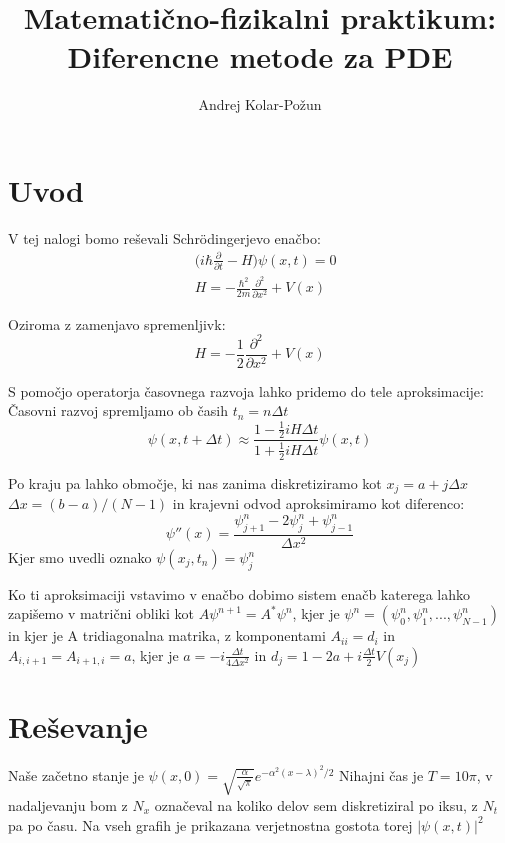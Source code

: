 \documentclass{article}
\title{Matemati{\v c}no-fizikalni praktikum: Diferencne metode za PDE}
\author{Andrej Kolar-Po{\v z}un}
\begin{document}
\maketitle
\newpage
{}

\section{Uvod}

V tej nalogi bomo reševali Schrödingerjevo enačbo:
\begin{align*}
&\Big(i\hbar \frac{\partial}{\partial t} - H \Big) \psi(x,t) = 0 \\
&H = -\frac{\hbar ^2}{2m} \frac{\partial ^2}{\partial x^2} + V(x) 
\end{align*}

Oziroma z zamenjavo spremenljivk:
\begin{equation*}
H = -\frac{1}{2}\frac{\partial^2}{\partial x^2} + V(x)
\end{equation*}

S pomočjo operatorja časovnega razvoja lahko pridemo do tele aproksimacije:
Časovni razvoj spremljamo ob časih $t_n = n \Delta t$
\begin{equation*}
\psi(x,t+\Delta t) \approx \frac{1-\frac{1}{2}i H \Delta t}{1+\frac{1}{2}i H \Delta t}\psi (x,t)
\end{equation*}

Po kraju pa lahko območje, ki nas zanima diskretiziramo kot $x_j = a+j \Delta x$ $\Delta x = (b-a)/(N-1)$ in krajevni odvod
aproksimiramo kot diferenco:
\begin{equation*}
\psi ''(x) = \frac{\psi_{j+1}^n - 2\psi_j^n + \psi_{j-1} ^n}{\Delta x^2}
\end{equation*}
Kjer smo uvedli oznako $\psi(x_j,t_n) = \psi_j^n$

Ko ti aproksimaciji vstavimo v enačbo dobimo sistem enačb katerega lahko zapišemo v matrični
obliki kot $A\psi^{n+1} = A^* \psi^n$, kjer je $\psi ^n = (\psi_0^n,\psi_1^n,...,\psi_{N-1}^n)$ in kjer je
A tridiagonalna matrika, z komponentami $A_{ii} = d_i$ in $A_{i, i+1} =A_{i+1,i} = a$,
kjer je $a = -i\frac{\Delta t}{4 \Delta x^2}$ in $d_j = 1 -2a + i\frac{\Delta t}{2}V(x_j)$

\section{Reševanje}
Naše začetno stanje je $\psi(x,0) = \sqrt{\frac{\alpha}{\sqrt{\pi}}} e^{-\alpha^2(x-\lambda)^2/2}$
Nihajni čas je $T=10\pi$, v nadaljevanju bom z $N_x$ označeval na koliko delov sem diskretiziral po iksu, z $N_t$ pa po času.
Na vseh grafih je prikazana verjetnostna gostota torej $|\psi(x,t)|^2$
\end{document}
